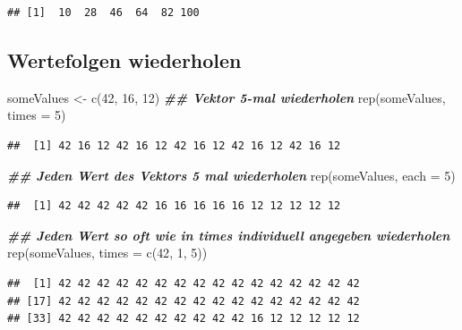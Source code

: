 \documentclass[
]{book}
\newenvironment{Shaded}{\begin{snugshade}}{\end{snugshade}}
\newcommand{\AttributeTok}[1]{\textcolor[rgb]{0.77,0.63,0.00}{#1}}
\newcommand{\DecValTok}[1]{\textcolor[rgb]{0.00,0.00,0.81}{#1}}
\newcommand{\DocumentationTok}[1]{\textcolor[rgb]{0.56,0.35,0.01}{\textbf{\textit{#1}}}}
\newcommand{\FunctionTok}[1]{\textcolor[rgb]{0.00,0.00,0.00}{#1}}
\newcommand{\NormalTok}[1]{#1}
\newcommand{\OtherTok}[1]{\textcolor[rgb]{0.56,0.35,0.01}{#1}}
\begin{document}
\begin{verbatim}
## [1]  10  28  46  64  82 100
\end{verbatim}

\hypertarget{wertefolgen-wiederholen}{%
\subsection{Wertefolgen wiederholen}\label{wertefolgen-wiederholen}}

\begin{Shaded}
\begin{Highlighting}[]
\NormalTok{someValues }\OtherTok{\textless{}{-}} \FunctionTok{c}\NormalTok{(}\DecValTok{42}\NormalTok{, }\DecValTok{16}\NormalTok{, }\DecValTok{12}\NormalTok{)}
 \DocumentationTok{\#\# Vektor 5{-}mal wiederholen}
\FunctionTok{rep}\NormalTok{(someValues, }\AttributeTok{times =} \DecValTok{5}\NormalTok{)}
\end{Highlighting}
\end{Shaded}

\begin{verbatim}
##  [1] 42 16 12 42 16 12 42 16 12 42 16 12 42 16 12
\end{verbatim}

\begin{Shaded}
\begin{Highlighting}[]
 \DocumentationTok{\#\# Jeden Wert des Vektors 5 mal wiederholen}
\FunctionTok{rep}\NormalTok{(someValues, }\AttributeTok{each =} \DecValTok{5}\NormalTok{)}
\end{Highlighting}
\end{Shaded}

\begin{verbatim}
##  [1] 42 42 42 42 42 16 16 16 16 16 12 12 12 12 12
\end{verbatim}

\begin{Shaded}
\begin{Highlighting}[]
 \DocumentationTok{\#\# Jeden Wert so oft wie in times individuell angegeben wiederholen}
\FunctionTok{rep}\NormalTok{(someValues, }\AttributeTok{times =} \FunctionTok{c}\NormalTok{(}\DecValTok{42}\NormalTok{, }\DecValTok{1}\NormalTok{, }\DecValTok{5}\NormalTok{))}
\end{Highlighting}
\end{Shaded}

\begin{verbatim}
##  [1] 42 42 42 42 42 42 42 42 42 42 42 42 42 42 42 42
## [17] 42 42 42 42 42 42 42 42 42 42 42 42 42 42 42 42
## [33] 42 42 42 42 42 42 42 42 42 42 16 12 12 12 12 12
\end{verbatim}
\end{document}
